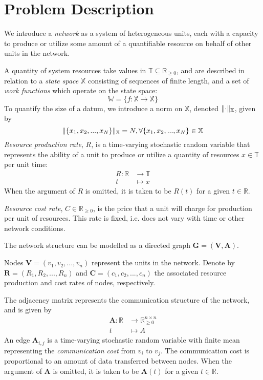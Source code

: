 \documentclass[../mthe-493-project-proposal.tex]{subfiles}
\begin{document}
    \chapter{Problem Description}
    \label{ch:problem-description}
    We introduce a \textit{network} as a system of heterogeneous units, each with a capacity to produce or utilize some amount of a quantifiable resource on behalf of other units in the network.

    A quantity of system resources take values in $\mathbb{T} \subseteq \mathbb{R}_{\geq 0}$, and are described in relation to a \textit{state space} $\mathbb{X}$ consisting of sequences of finite length, and a set of \textit{work functions} which operate on the state space:
    \begin{equation*}
        \mathbb{W} = \{f: \mathbb{X} \rightarrow \mathbb{X}\}
    \end{equation*}
    To quantify the size of a datum, we introduce a norm on $\mathbb{X}$, denoted $\lVert\cdot\rVert_{\mathbb{X}}$, given by
    \begin{equation*}
        \lVert\{x_1, x_2, ..., x_N\}\rVert_{\mathbb{X}} = N, \forall \{x_1, x_2, ..., x_N\} \in \mathbb{X}
    \end{equation*}
    \textit{Resource production rate}, $R$, is a time-varying stochastic random variable that represents the ability of a unit to produce or utilize a quantity of resources $x \in \mathbb{T}$ per unit time:
    \begin{align*}
        R \colon \mathbb{R} &\to \mathbb{T} \\
        t                   &\mapsto x
    \end{align*}
    When the argument of $R$ is omitted, it is taken to be $R(t)$ for a given $t \in \mathbb{R}$.

    \textit{Resource cost rate}, $C \in \mathbb{R}_{\geq 0}$, is the price that a unit will charge for production per unit of resources. This rate is fixed, i.e. does not vary with time or other network conditions.

    The network structure can be modelled as a directed graph $\mathbf{G} = (\mathbf{V}, \mathbf{A})$.

    Nodes $\mathbf{V} = (v_1, v_2, ..., v_n)$ represent the units in the network. Denote by $\mathbf{R} = (R_1, R_2, ..., R_n)$ and $\mathbf{C} = (c_1, c_2, ..., c_n)$ the associated resource production and cost rates of nodes, respectively.

    The adjacency matrix represents the communication structure of the network, and is given by
    \begin{align*}
        \mathbf{A} \colon \mathbb{R} &\to \mathbb{R}^{n \times n}_{\geq 0} \\
        t                            &\mapsto A
    \end{align*}
    An edge $\mathbf{A}_{i,j}$ is a time-varying stochastic random variable with finite mean representing the \textit{communication cost} from $v_i$ to $v_j$. The communication cost is proportional to an amount of data transferred between nodes. When the argument of $\mathbf{A}$ is omitted, it is taken to be $\mathbf{A}(t)$ for a given $t \in \mathbb{R}$.
\end{document}
